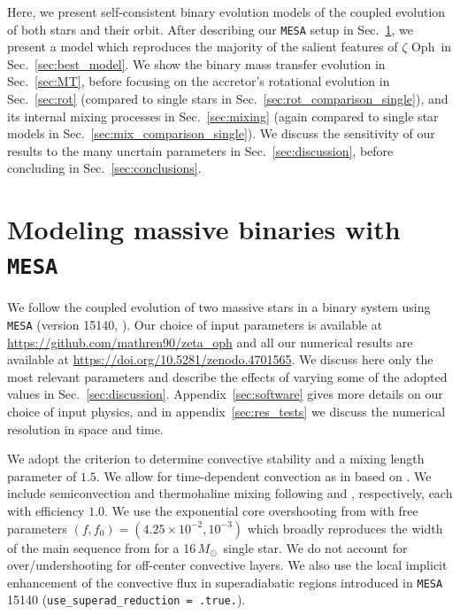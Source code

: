 \documentclass[twocolumn,twocolappendix,trackchanges]{aastex63}
\DeclareRobustCommand{\Secref}[1]{Sec.~\ref{#1}}
\newcommand{\zoph}{$\zeta$ Oph}
\newcommand{\Msun}{\ensuremath{\,M_\odot}}
\begin{document}
Here, we present
self-consistent binary evolution models of the coupled evolution of
both stars and their orbit. After describing our \texttt{MESA} setup
in \Secref{sec:methods}, we present a model which reproduces the
majority of the salient features of \zoph\ in
\Secref{sec:best_model}. We show the binary mass transfer evolution in
\Secref{sec:MT}, before focusing on the accretor's rotational
evolution in \Secref{sec:rot} (compared to single stars in
\Secref{sec:rot_comparison_single}), and its internal mixing processes
in \Secref{sec:mixing} (again compared to single star models in
\Secref{sec:mix_comparison_single}). We discuss the sensitivity of our
results to the many uncrtain parameters in \Secref{sec:discussion}, before
concluding in \Secref{sec:conclusions}.



\section{Modeling massive binaries with \texttt{MESA}}
\label{sec:methods}

We follow the coupled evolution of two massive stars in a binary
system using \texttt{MESA} (version 15140, \citealt{paxton:11,
  paxton:13, paxton:15, paxton:18, paxton:19}). Our choice of input
parameters is available at \url{https://github.com/mathren90/zeta_oph}
and all our numerical results are available at
\url{https://doi.org/10.5281/zenodo.4701565}. We discuss here only the
most relevant parameters and describe the effects of varying some of
the adopted values in
\Secref{sec:discussion}. Appendix~\ref{sec:software} gives more
details on our choice of input physics, and in
appendix~\ref{sec:res_tests} we discuss the numerical resolution in space
and time.

We adopt the \cite{ledoux:47} criterion to determine convective
stability and a mixing length parameter of $1.5$. We allow for
time-dependent convection as in \cite{renzo:20:ppi_conv} based on
\cite{arnett:69}. We include semiconvection and thermohaline mixing
following \cite{langer:83} and \cite{kippenhahn:80}, respectively,
each with efficiency $1.0$.  We use the exponential core overshooting
from \cite{herwig:00} with free parameters
$(f, f_0)=(4.25\times10^{-2}, 10^{-3})$ \citep{claret:17} which
broadly reproduces the width of the main sequence from \cite{brott:11}
for a 16\Msun\ single star. We do not account for over/undershooting for
off-center convective layers. We also use the local implicit
enhancement of the convective flux in superadiabatic regions
introduced in \texttt{MESA} 15140 (\texttt{use\_superad\_reduction = .true.}).
\end{document}
